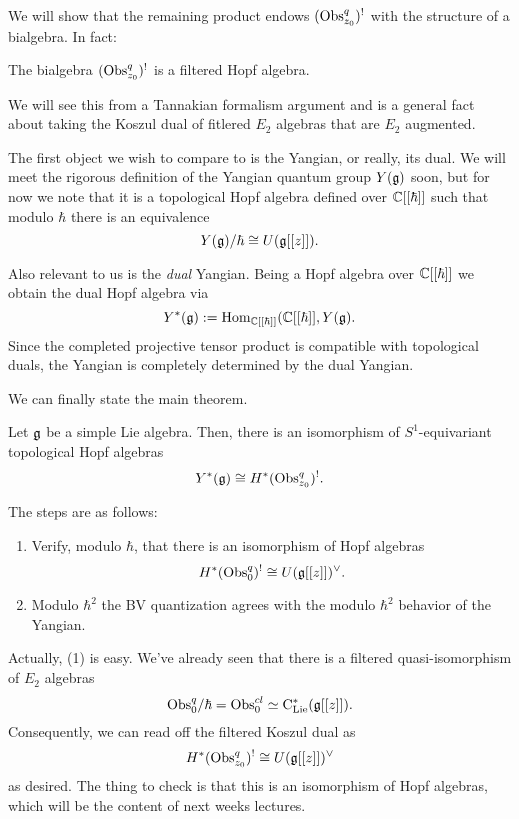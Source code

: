 \documentclass[11pt]{amsart}
\begin{document}
We will show that the remaining product endows $({\rm Obs}^q_{z_0})^{!}$ with the structure of a bialgebra. 
In fact:

\begin{prop}
The bialgebra $({\rm Obs}^q_{z_0})^{!}$ is a filtered Hopf algebra. 
\end{prop}

We will see this from a Tannakian formalism argument and is a general fact about taking the Koszul dual of fitlered $E_2$ algebras that are $E_2$ augmented. 

The first object we wish to compare to is the Yangian, or really, its dual. 
We will meet the rigorous definition of the Yangian quantum group $Y(\mathfrak g)$ soon, but for now we note that it is a topological Hopf algebra defined over $\mathbb C[[\hbar]]$ such that modulo $\hbar$ there is an equivalence
\[
Y(\mathfrak g) / \hbar \cong U(\mathfrak g[[z]]) .
\] 

Also relevant to us is the {\em dual} Yangian. 
Being a Hopf algebra over $\mathbb C[[\hbar]]$ we obtain the dual Hopf algebra via
\[
Y^*(\mathfrak g) := {\rm Hom}_{\mathbb C[[\hbar]]} (\mathbb C[[\hbar]], Y(\mathfrak g) .
\] 
Since the completed projective tensor product is compatible with topological duals, the Yangian is completely determined by the dual Yangian. 

We can finally state the main theorem. 

\begin{thm} \label{thm: yangian}
Let $\mathfrak g$ be a simple Lie algebra. 
Then, there is an isomorphism of $S^1$-equivariant topological Hopf algebras
\[
Y^*(\mathfrak g) \cong H^*({\rm Obs}^q_{z_0})^{!} .
\] 
\end{thm}

The steps are as follows:
\begin{enumerate}
\item Verify, modulo $\hbar$, that there is an isomorphism of Hopf algebras
\[
H^*({\rm Obs}^q_{0})^{!} \cong U(\mathfrak g[[z]])^\vee .
\] 

\item Modulo $\hbar^2$ the BV quantization agrees with the modulo $\hbar^2$ behavior of the Yangian. 

\end{enumerate}

Actually, (1) is easy. 
We've already seen that there is a filtered quasi-isomorphism of $E_2$ algebras
\[
{\rm Obs}_{0}^{q} / \hbar = {\rm Obs}^{cl}_{0} \simeq {\rm C}_{{\rm Lie}}^*(\mathfrak g[[z]]) .
\] 
Consequently, we can read off the filtered Koszul dual as
\[
H^*({\rm Obs}^q_{z_0})^{!} \cong U(\mathfrak g[[z]])^\vee
\]
as desired. 
The thing to check is that this is an isomorphism of Hopf algebras, which will be the content of next weeks lectures. 
\end{document}
